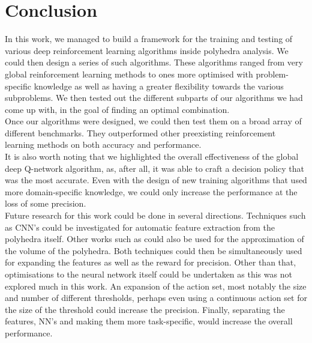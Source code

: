 \chapter{Conclusion}
In this work, we managed to build a framework for the training and testing of various deep reinforcement learning algorithms inside polyhedra analysis. We could then design a series of such algorithms. These algorithms ranged from very global reinforcement learning methods to ones more optimised with problem-specific knowledge as well as having a greater flexibility towards the various subproblems. We then tested out the different subparts of our algorithms we had come up with, in the goal of finding an optimal combination.\\
Once our algorithms were designed, we could then test them on a broad array of different benchmarks. They outperformed other preexisting reinforcement learning methods on both accuracy and performance.\\
It is also worth noting that we highlighted the overall effectiveness of the global deep Q-network algorithm, as, after all, it was able to craft a decision policy that was the most accurate. Even with the design of new training algorithms that used more domain-specific knowledge, we could only increase the performance at the loss of some precision.\\
Future research for this work could be done in several directions. Techniques such as CNN's could be investigated for automatic feature extraction from the polyhedra itself. Other works such as \cite{dyer1991random, kim2004fast} could also be used for the approximation of the volume of the polyhedra. Both techniques could then be simultaneously used for expanding the features as well as the reward for precision. Other than that, optimisations to the neural network itself could be undertaken as this was not explored much in this work. An expansion of the action set, most notably the size and number of different thresholds, perhaps even using a continuous action set for the size of the threshold could increase the precision. Finally, separating the features, NN's and making them more task-specific, would increase the overall performance.